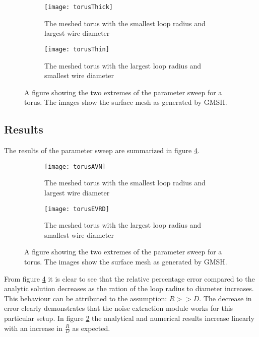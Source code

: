 \begin{figure}[h]
    \centering
    \begin{subfigure}[b]{0.45\textwidth}
        \centering
        \texttt{[image: torusThick]}
        \caption{The meshed torus with the smallest loop radius and largest wire diameter}
    \end{subfigure}
    \hfill
    \begin{subfigure}[b]{0.45\textwidth}
        \centering
        \texttt{[image: torusThin]}
        \caption{The meshed torus with the largest loop radius and smallest wire diameter}
    \end{subfigure}
    \caption{A figure showing the two extremes of the parameter sweep for a torus. The images show the surface mesh as generated by GMSH.}
    \label{fig:meshedTorus}
\end{figure}
\subsection{Results}

The results of the parameter sweep are summarized in figure \ref{fig:resTorus}.
\begin{figure}[H]
    \centering
    \begin{subfigure}[b]{0.48\textwidth}
        \centering
        \texttt{[image: torusAVN]}
        \caption{The meshed torus with the smallest loop radius and largest wire diameter}
        \label{fig:MSFNvRD}
    \end{subfigure}
    \hfill
    \begin{subfigure}[b]{0.48\textwidth}
        \centering
        \texttt{[image: torusEVRD]}
        \caption{The meshed torus with the largest loop radius and smallest wire diameter}
        \label{fig:evRD}
    \end{subfigure}
    \caption{A figure showing the two extremes of the parameter sweep for a torus. The images show the surface mesh as generated by GMSH.}
    \label{fig:resTorus}
\end{figure}
From figure \ref{fig:resTorus} it is clear to see that the relative percentage error compared to the analytic solution decreases as the ration of the loop radius to diameter increases. This behaviour can be attributed to the assumption: $R >> D$. The decrease in error clearly demonstrates that the noise extraction module works for this particular setup. In figure \ref{fig:MSFNvRD} the analytical and numerical results increase linearly with an increase in $\frac{R}{D}$ as expected.

